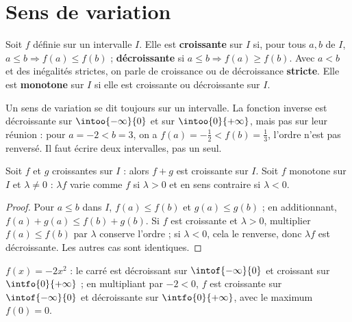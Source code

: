 \section{Sens de variation}
\begin{definition}
Soit $f$ définie sur un intervalle $I$. Elle est \textbf{croissante} sur $I$ si, pour tous $a,b$ de $I$, $a\le b\Rightarrow f(a)\le f(b)$ ; \textbf{décroissante} si $a\le b\Rightarrow f(a)\ge f(b)$. Avec $a<b$ et des inégalités strictes, on parle de croissance ou de décroissance \textbf{stricte}. Elle est \textbf{monotone} sur $I$ si elle est croissante ou décroissante sur $I$.
\end{definition}
\begin{pitfall}
Un sens de variation se dit toujours sur un intervalle. La fonction inverse est décroissante sur $\intoo{-\infty}{0}$ et sur $\intoo{0}{+\infty}$, mais pas sur leur réunion : pour $a=-2<b=3$, on a $f(a)=-\frac12<f(b)=\frac13$, l'ordre n'est pas renversé. Il faut écrire deux intervalles, pas un seul.
\end{pitfall}
\begin{theorem}
Soit $f$ et $g$ croissantes sur $I$ : alors $f+g$ est croissante sur $I$. Soit $f$ monotone sur $I$ et $\lambda\ne0$ : $\lambda f$ varie comme $f$ si $\lambda>0$ et en sens contraire si $\lambda<0$.
\end{theorem}
\begin{proof}
Pour $a\le b$ dans $I$, $f(a)\le f(b)$ et $g(a)\le g(b)$ ; en additionnant, $f(a)+g(a)\le f(b)+g(b)$. Si $f$ est croissante et $\lambda>0$, multiplier $f(a)\le f(b)$ par $\lambda$ conserve l'ordre ; si $\lambda<0$, cela le renverse, donc $\lambda f$ est décroissante. Les autres cas sont identiques.
\end{proof}
\begin{example}
$f(x)=-2x^2$ : le carré est décroissant sur $\intof{-\infty}{0}$ et croissant sur $\intfo{0}{+\infty}$ ; en multipliant par $-2<0$, $f$ est croissante sur $\intof{-\infty}{0}$ et décroissante sur $\intfo{0}{+\infty}$, avec le maximum $f(0)=0$.
\end{example}

